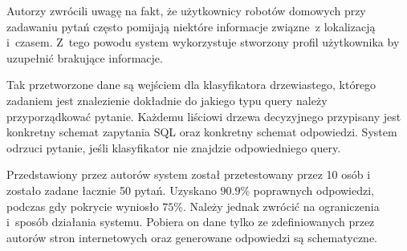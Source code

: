 Autorzy \cite{restrictedWeather} zwrócili uwagę na fakt, że użytkownicy robotów domowych przy zadawaniu pytań często pomijają niektóre informacje związne~z lokalizacją i~czasem. Z~tego powodu system wykorzystuje stworzony profil użytkownika by uzupełnić brakujące informacje.

Tak przetworzone dane są wejściem dla klasyfikatora drzewiastego, którego zadaniem jest znalezienie dokładnie do jakiego typu query należy przyporządkować pytanie. Każdemu liściowi drzewa decyzyjnego przypisany jest konkretny schemat zapytania SQL oraz konkretny schemat odpowiedzi. System odrzuci pytanie, jeśli klasyfikator nie znajdzie odpowiedniego query.

Przedstawiony przez autorów \cite{restrictedWeather} system został przetestowany przez 10 osób i~ zostało zadane łacznie 50 pytań. Uzyskano $\num{90.9}$\% poprawnych odpowiedzi, podczas gdy pokrycie wyniosło $\num{75}$\%. Należy jednak zwrócić na ograniczenia i~sposób działania systemu. Pobiera on dane tylko ze zdefiniowanych przez autorów stron internetowych oraz generowane odpowiedzi są schematyczne.



